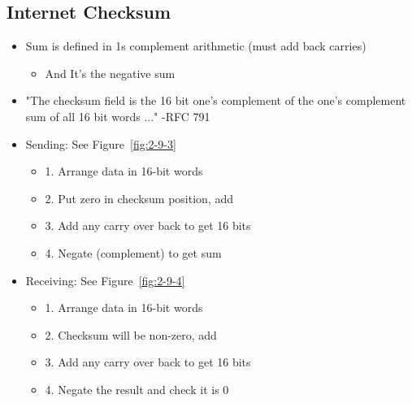 \documentclass[12pt]{ctexart}   %
\begin{document}
	\subsection{Internet Checksum}
	\begin{itemize}
		\item Sum is defined in 1s complement arithmetic (must add back carries)
		\begin{itemize}
			\item And It's the negative sum
		\end{itemize}
		
		\item "The checksum field is the 16 bit one's complement of the one's complement sum of all 16 bit words ..." -RFC 791
		
		\item Sending:     See Figure~\ref{fig:2-9-3}
		\begin{itemize}
			\item {\color{blue} 1.} Arrange data in 16-bit words
			\item {\color{blue} 2.} Put zero in checksum position, add
			\item {\color{blue} 3.} Add any carry over back to get 16 bits
			\item {\color{blue} 4.} Negate (complement) to get sum
		\end{itemize}
		
		\item Receiving:       See Figure~\ref{fig:2-9-4}
		\begin{itemize}
			\item {\color{blue} 1.} Arrange data in 16-bit words
			\item {\color{blue} 2.} Checksum will be non-zero, add
			\item {\color{blue} 3.} Add any carry over back to get 16 bits
			\item {\color{blue} 4.} Negate the result and check it is 0
		\end{itemize}
		

\end{itemize}
\end{document}
